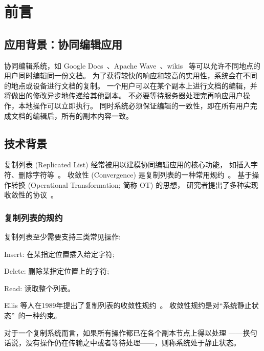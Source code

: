 \chapter{前言}
\section{应用背景：协同编辑应用}

协同编辑系统，如 Google Docs~\cite{GoogleDocs}、Apache Wave~\cite{Wave}、wikis~\cite{Leuf:Wiki01} 
等可以允许不同地点的用户同时编辑同一份文档。
为了获得较快的响应和较高的实用性，系统会在不同的地点或设备进行文档的复制。
一个用户可以在某个副本上进行文档的编辑，并将做出的修改异步地传递给其他副本。
不必要等待服务器处理完再响应用户操作，本地操作可以立即执行。
同时系统必须保证编辑的一致性，即在所有用户完成文档的编辑后，所有的副本内容一致。

\section{技术背景}

复制列表 (Replicated List) 经常被用以建模协同编辑应用的核心功能，
如插入字符、删除字符等~\cite{Ellis:SIGMOD89, Nichols:UIST95, Attiya:PODC16}。
收敛性 (Convergence) 是复制列表的一种常用规约~\cite{Ellis:SIGMOD89}。
基于操作转换 (Operational Transformation; 简称 OT) 的思想，
研究者提出了多种实现收敛性的协议~\cite{Ellis:SIGMOD89, Prakash:TOCHI94, Nichols:UIST95, Sun:TOCHI98, Sun:CSCW98, 
Vidot:CSCW00, Shen:CSCW02, Sun:TOCHI02, Li:ICPADS04, Sun:TPDS09, Sun:CSCW14}。

\subsection{复制列表的规约}
复制列表至少需要支持三类常见操作: 
\begin{inparaenum}[(1)]
  \item Insert: 在某指定位置插入给定字符;
  \item Delete: 删除某指定位置上的字符;
  \item Read: 读取整个列表。
\end{inparaenum}

Ellis 等人在1989年提出了复制列表的收敛性规约~\cite{Ellis:SIGMOD89}。
收敛性规约是对``系统静止状态''~\cite{Ellis:SIGMOD89}的一种约束。
\begin{definition}
  对于一个复制系统而言，如果所有操作都已在各个副本节点上得以处理
  ——换句话说，没有操作仍在传输之中或者等待处理——，则称系统处于静止状态。
\end{definition}

